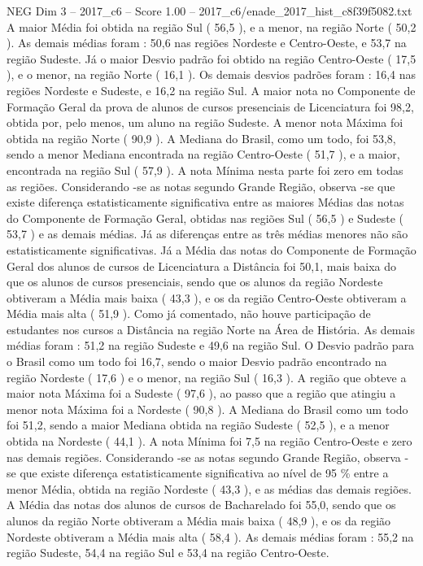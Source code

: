 \begin{textsample}{NEG Dim 3 – 2017\_c6 – Score 1.00 – 2017\_c6/enade\_2017\_hist\_c8f39f5082.txt}
A maior Média foi obtida na região Sul ( 56,5 ), e a menor, na região Norte ( 50,2 ).
As demais médias foram : 50,6 nas regiões Nordeste e Centro-Oeste, e 53,7 na região Sudeste.
Já o maior Desvio padrão foi obtido na região Centro-Oeste ( 17,5 ), e o menor, na região Norte ( 16,1 ).
Os demais desvios padrões foram : 16,4 nas regiões Nordeste e Sudeste, e 16,2 na região Sul.
A maior nota no Componente de Formação Geral da prova de alunos de cursos presenciais de Licenciatura foi 98,2, obtida por, pelo menos, um aluno na região Sudeste.
A menor nota Máxima foi obtida na região Norte ( 90,9 ).
A Mediana do Brasil, como um todo, foi 53,8, sendo a menor Mediana encontrada na região Centro-Oeste ( 51,7 ), e a maior, encontrada na região Sul ( 57,9 ).
A nota Mínima nesta parte foi zero em todas as regiões.
Considerando -se as notas segundo Grande Região, observa -se que existe diferença estatisticamente significativa entre as maiores Médias das notas do Componente de Formação Geral, obtidas nas regiões Sul ( 56,5 ) e Sudeste ( 53,7 ) e as demais médias.
Já as diferenças entre as três médias menores não são estatisticamente significativas.
Já a Média das notas do Componente de Formação Geral dos alunos de cursos de Licenciatura a Distância foi 50,1, mais baixa do que os alunos de cursos presenciais, sendo que os alunos da região Nordeste obtiveram a Média mais baixa ( 43,3 ), e os da região Centro-Oeste obtiveram a Média mais alta ( 51,9 ).
Como já comentado, não houve participação de estudantes nos cursos a Distância na região Norte na Área de História.
As demais médias foram : 51,2 na região Sudeste e 49,6 na região Sul.
O Desvio padrão para o Brasil como um todo foi 16,7, sendo o maior Desvio padrão encontrado na região Nordeste ( 17,6 ) e o menor, na região Sul ( 16,3 ).
A região que obteve a maior nota Máxima foi a Sudeste ( 97,6 ), ao passo que a região que atingiu a menor nota Máxima foi a Nordeste ( 90,8 ).
A Mediana do Brasil como um todo foi 51,2, sendo a maior Mediana obtida na região Sudeste ( 52,5 ), e a menor obtida na Nordeste ( 44,1 ).
A nota Mínima foi 7,5 na região Centro-Oeste e zero nas demais regiões.
Considerando -se as notas segundo Grande Região, observa -se que existe diferença estatisticamente significativa ao nível de 95 \% entre a menor Média, obtida na região Nordeste ( 43,3 ), e as médias das demais regiões.
A Média das notas dos alunos de cursos de Bacharelado foi 55,0, sendo que os alunos da região Norte obtiveram a Média mais baixa ( 48,9 ), e os da região Nordeste obtiveram a Média mais alta ( 58,4 ).
As demais médias foram : 55,2 na região Sudeste, 54,4 na região Sul e 53,4 na região Centro-Oeste.

\end{textsample}
